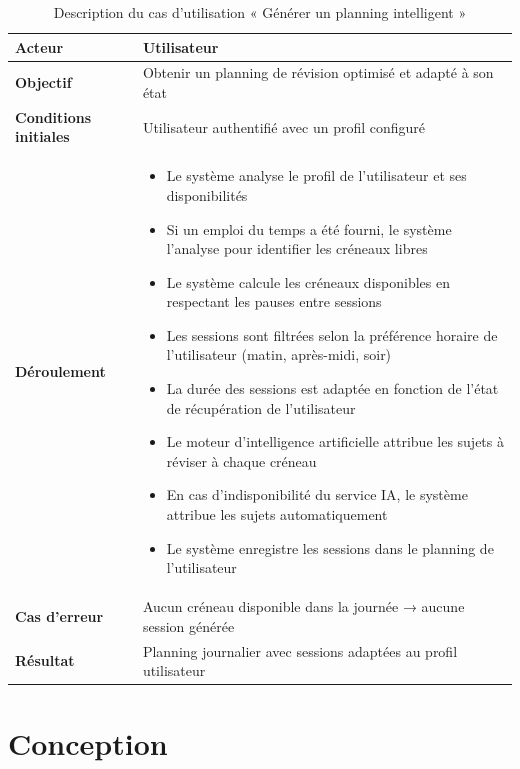 \begin{table}[H]
\centering
\renewcommand{\arraystretch}{1.2}
\begin{tabular}{|p{4cm}|p{10cm}|}
\hline
\textbf{Acteur} & Utilisateur \\ \hline
\textbf{Objectif} & Obtenir un planning de révision optimisé et adapté à
                    son état \\ \hline
\textbf{Conditions initiales} & Utilisateur authentifié avec un profil
                                 configuré \\ \hline
\textbf{Déroulement} &
\begin{itemize}
    \item Le système analyse le profil de l'utilisateur et ses disponibilités
    \item Si un emploi du temps a été fourni, le système l'analyse pour identifier les créneaux libres
    \item Le système calcule les créneaux disponibles en respectant les pauses entre sessions
    \item Les sessions sont filtrées selon la préférence horaire de l'utilisateur (matin, après-midi, soir)
    \item La durée des sessions est adaptée en fonction de l'état de récupération de l'utilisateur
    \item Le moteur d'intelligence artificielle attribue les sujets à réviser à chaque créneau
    \item En cas d'indisponibilité du service IA, le système attribue les sujets automatiquement
    \item Le système enregistre les sessions dans le planning de l'utilisateur
\end{itemize} \\ \hline
\textbf{Cas d'erreur} & Aucun créneau disponible dans la journée →
                        aucune session générée \\ \hline
\textbf{Résultat} & Planning journalier avec sessions adaptées au profil
                    utilisateur \\ \hline
\end{tabular}
\caption{Description du cas d'utilisation « Générer un planning intelligent »}
\label{tab:uc_planning}
\end{table}

\section{Conception}

